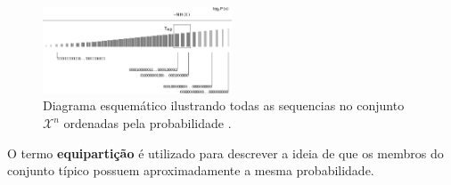 \begin{frame}[allowframebreaks]


  \framebreak
  \begin{figure}[h!]
  \centering
  \includegraphics[width=0.5\textwidth]{images/seq100mackay3.pdf}
  \caption{Diagrama esquemático ilustrando todas as sequencias no conjunto $\mathcal{X}^n$ ordenadas pela probabilidade \citep{mackay2003}.}
  \label{fig:seq100mackay3}
  \end{figure}


  O termo \textbf{equipartição} é utilizado para descrever a ideia de que os membros do conjunto típico
  possuem aproximadamente a mesma probabilidade.

\end{frame}

